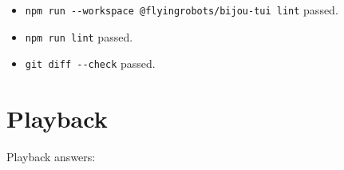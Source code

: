 \begin{itemize}
\item
  \texttt{n\allowbreak{}p\allowbreak{}m\allowbreak{} \allowbreak{}r\allowbreak{}u\allowbreak{}n\allowbreak{} \allowbreak{}-\allowbreak{}-\allowbreak{}w\allowbreak{}o\allowbreak{}r\allowbreak{}k\allowbreak{}s\allowbreak{}p\allowbreak{}a\allowbreak{}c\allowbreak{}e\allowbreak{} \allowbreak{}@\allowbreak{}f\allowbreak{}l\allowbreak{}y\allowbreak{}i\allowbreak{}n\allowbreak{}g\allowbreak{}r\allowbreak{}o\allowbreak{}b\allowbreak{}o\allowbreak{}t\allowbreak{}s\allowbreak{}/\allowbreak{}b\allowbreak{}i\allowbreak{}j\allowbreak{}o\allowbreak{}u\allowbreak{}-\allowbreak{}t\allowbreak{}u\allowbreak{}i\allowbreak{} \allowbreak{}l\allowbreak{}i\allowbreak{}n\allowbreak{}t} passed.
\item
  \texttt{n\allowbreak{}p\allowbreak{}m\allowbreak{} \allowbreak{}r\allowbreak{}u\allowbreak{}n\allowbreak{} \allowbreak{}l\allowbreak{}i\allowbreak{}n\allowbreak{}t} passed.
\item
  \texttt{g\allowbreak{}i\allowbreak{}t\allowbreak{} \allowbreak{}d\allowbreak{}i\allowbreak{}f\allowbreak{}f\allowbreak{} \allowbreak{}-\allowbreak{}-\allowbreak{}c\allowbreak{}h\allowbreak{}e\allowbreak{}c\allowbreak{}k} passed.
\end{itemize}

\section{Playback}\label{record-162-playback}

Playback answers:

